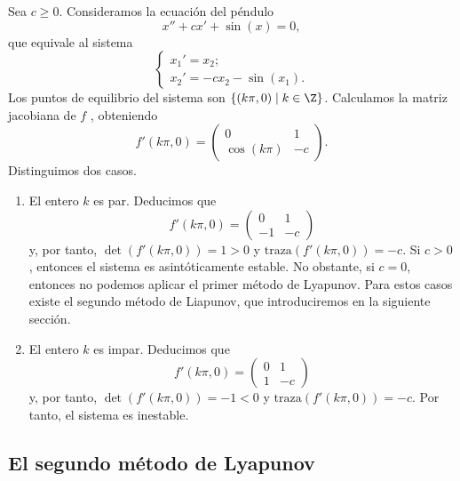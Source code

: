 \begin{ex}
  Sea $c \ge 0$. Consideramos la ecuación del péndulo
  \begin{equation}
    \label{eq:pendulo:estabilidad}
    x'' + cx' + \sin(x) = 0,
  \end{equation}
  que equivale al sistema
  \begin{equation}
    \label{eq:pendulo:estabilidad:2}
    \begin{cases}      
    x_1' = x_2; \\
    x_2' = - c x_2 - \sin(x_1).
    \end{cases}
  \end{equation}
  Los puntos de equilibrio del sistema son $\{(k \pi , 0) \mid k \in \Z\}$. Calculamos la matriz
  jacobiana de $f$ , obteniendo
  \[ f'(k\pi, 0) = \left(
      \begin{matrix}
        0 & 1 \\
        \cos(k \pi) & -c
      \end{matrix}
    \right). \] Distinguimos dos casos.
  
  \begin{enumerate}
  \item El entero $k$ es par. Deducimos que
    \[ f'(k\pi, 0) = \left(
        \begin{matrix}
          0 & 1 \\
          -1 & -c
        \end{matrix}
      \right) \] y, por tanto, $\det(f'(k \pi, 0)) = 1 > 0$ y $\mathrm{traza}(f'(k\pi,0)) = -c$. Si
    $c > 0$, entonces el sistema es asintóticamente estable. No obstante, si $c=0$, entonces no
    podemos aplicar el primer método de Lyapunov. Para estos casos existe el segundo método de
    Liapunov, que introduciremos en la siguiente sección.
  \item El entero $k$ es impar. Deducimos que
    \[ f'(k\pi, 0) = \left(
        \begin{matrix}
          0 & 1 \\
          1 & -c
        \end{matrix}
      \right) \] y, por tanto, $\det(f'(k \pi, 0)) = -1 < 0$ y $\mathrm{traza}(f'(k\pi,0)) = -c$. Por
    tanto, el sistema es inestable. \qedhere
  \end{enumerate}
\end{ex}


\subsection{El segundo método de Lyapunov}

